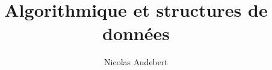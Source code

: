 \documentclass{beamer}
\begin{document}
\title[Cours d'algorithmique]{Algorithmique et structures de données}
\author[nicolas.audebert@lecnam.net]{Nicolas Audebert}
\setmainfont{Fira Sans}


\end{document}
